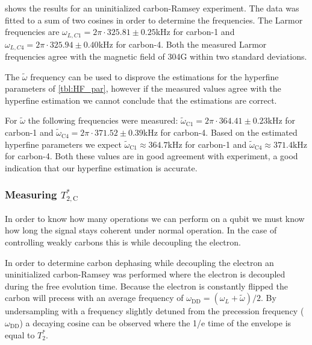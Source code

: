  shows the results for an uninitialized carbon-Ramsey experiment.
The data was fitted to a sum of two cosines in order to determine the frequencies.
The Larmor frequencies are $\omega_{L,C1} = 2\pi\cdot 325.81 \pm 0.25$kHz  for carbon-1 and  $\omega_{L,C4} =  2\pi\cdot 325.94 \pm 0.40$kHz for carbon-4.
Both the measured Larmor frequencies agree with the magnetic field of 304G within two standard deviations.

The $\tilde{\omega}$ frequency can be used to disprove the estimations for the hyperfine parameters of \cref{tbl:HF_par}, however if the measured values agree with the hyperfine estimation we cannot conclude that the estimations are correct.

For $\tilde{\omega}$ the following frequencies were measured: $\tilde \omega_{\mathrm{C1}}= 2\pi\cdot 364.41 \pm 0.23$kHz for carbon-1
and $\tilde \omega_{\mathrm{C4}} = 2\pi\cdot 371.52 \pm 0.39 $kHz for carbon-4.
Based on the estimated hyperfine parameters we expect $\tilde\omega_{\mathrm{C1}} \approx 364.7\mathrm{kHz}$ for carbon-1 and $\tilde \omega_{\mathrm{C4}} \approx 371.4 \mathrm{kHz}$ for carbon-4.
Both these values are in good agreement with experiment, a good indication that our hyperfine estimation is accurate.

\subsubsection{Measuring $T_{2,\mathrm{C}}^* $}
In order to know how many operations we can perform on a qubit we must know how long the signal stays coherent under normal operation.
In the case of controlling weakly carbons this is while decoupling the electron.

In order to determine carbon dephasing while decoupling the electron an uninitialized carbon-Ramsey was performed where the electron is decoupled during the free evolution time.
Because the electron is constantly flipped the carbon will precess with an average frequency of $\omega_{\mathrm{DD}} = (\omega_L +\tilde{\omega} )/2$.
By undersampling with a frequency slightly detuned from the precession frequency ($\omega_{\mathrm{DD}}$) a decaying cosine can be observed where the 1/e time of the envelope is equal to $T_2^*$.

